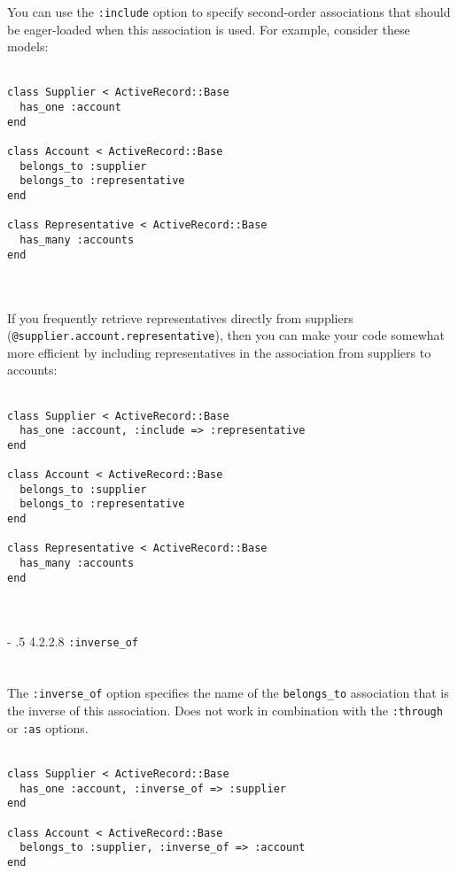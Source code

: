 \documentclass[10pt]{book}
\makeatletter
\renewcommand\paragraph{%
   \@startsection{paragraph}{4}{0mm}%
      {-\baselineskip}%
      {.5\baselineskip}%
      {\normalfont\scriptsize\bfseries}}
\makeatother
\begin{document}
You can use the \texttt{:include} option to specify second-order  associations that should be eager-loaded when this association is used.  For example, consider these models:
\\ \\
\begin{minipage}{\textwidth}{\scriptsize
\begin{verbatim}
class Supplier < ActiveRecord::Base
  has_one :account
end
 
class Account < ActiveRecord::Base
  belongs_to :supplier
  belongs_to :representative
end
 
class Representative < ActiveRecord::Base
  has_many :accounts
end
\end{verbatim}}
\end{minipage}
\\ \\

If you frequently retrieve representatives directly from suppliers (\texttt{@supplier.account.representative}),  then you can make your code somewhat more efficient by including  representatives in the association from suppliers to accounts:
\\ \\
\begin{minipage}{\textwidth}{\scriptsize
\begin{verbatim}
class Supplier < ActiveRecord::Base
  has_one :account, :include => :representative
end
 
class Account < ActiveRecord::Base
  belongs_to :supplier
  belongs_to :representative
end
 
class Representative < ActiveRecord::Base
  has_many :accounts
end
\end{verbatim}}
\end{minipage}
\\ \\

\paragraph{4.2.2.8 \texttt{:inverse\_of}}\\ \\\\

The \texttt{:inverse\_of} option specifies the name of the \texttt{belongs\_to} association that is the inverse of this association. Does not work in combination with the \texttt{:through} or \texttt{:as} options.
\\ \\
\begin{minipage}{\textwidth}{\scriptsize
\begin{verbatim}
class Supplier < ActiveRecord::Base
  has_one :account, :inverse_of => :supplier
end
 
class Account < ActiveRecord::Base
  belongs_to :supplier, :inverse_of => :account
end
\end{verbatim}}
\end{minipage}
\\ \\
\end{document}
